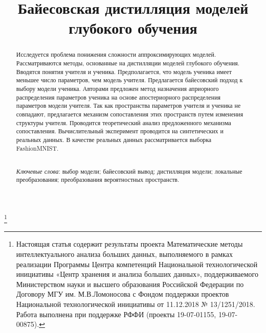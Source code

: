 \documentclass[12pt]{a&t}
\begin{document}


\title{Байесовская дистилляция моделей глубокого обучения}%
\thanks{Настоящая статья содержит результаты проекта Математические методы интеллектуального анализа больших данных, выполняемого в рамках реализации Программы Центра компетенций Национальной технологической инициативы «Центр хранения и анализа больших данных», поддерживаемого Министерством науки и высшего образования Российской Федерации по Договору МГУ им. М.В.Ломоносова с Фондом поддержки проектов Национальной технологической инициативы от 11.12.2018 № 13/1251/2018. Работа выполнена при поддержке РФФИ (проекты 19-07-01155, 19-07-00875).}


\maketitle

\begin{abstract}
Исследуется проблема понижения сложности аппроксимирующих моделей. 
Рассматриваются методы, основанные на дистилляции моделей глубокого обучения. 
Вводятся понятия учителя и ученика. Предполагается, что модель ученика имеет меньшее число параметров, чем модель учителя. 
Предлагается байесовский подход к выбору модели ученика. 
Авторами предложен метод назначения априорного распределения параметров ученика на основе апостериорного распределения параметров модели учителя. 
Так как пространства параметров учителя и ученика не совпадают, предлагается механизм сопоставления этих пространств путем изменения структуры учителя.
Проводится теоретический анализ предложенного механизма сопоставления. Вычислительный эксперимент проводится на синтетических и реальных данных. В качестве реальных данных рассматривается выборка FashionMNIST.

\smallskip\\
\textit{Ключевые слова}: выбор модели; байесовский вывод; дистилляция модели; локальные преобразования; преобразования вероятностных пространств.
\end{abstract}
\end{document}
